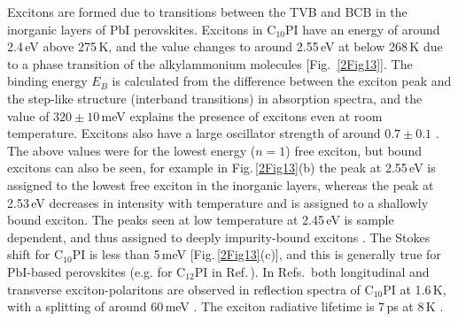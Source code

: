 Excitons are formed due to transitions between the TVB and BCB in the inorganic layers of PbI perovskites. Excitons in $\textrm{C}_{10}$PI have an energy of around 2.4\,eV above 275\,K, and the value changes to around 2.55\,eV at below 268\,K due to a phase transition of the alkylammonium molecules [Fig.\ \ref{2Fig13}]. The binding energy $E_B$ is calculated from the difference between the exciton peak and the step-like structure (interband transitions) in absorption spectra, and the value of $320\pm10$\,meV explains the presence of excitons even at room temperature. Excitons also have a large oscillator strength of around $0.7\pm0.1$ \cite{Ishihara1990}. The above values were for the lowest energy ($n=1$) free exciton, but bound excitons can also be seen, for example in Fig.\,\ref{2Fig13}(b) the peak at 2.55\,eV is assigned to the lowest free exciton in the inorganic layers, whereas the peak at 2.53\,eV decreases in intensity with temperature and is assigned to a shallowly bound exciton. The peaks seen at low temperature at 2.45\,eV is sample dependent, and thus assigned to deeply impurity-bound excitons \cite{Ishihara1990}. The Stokes shift for $\textrm{C}_{10}$PI is less than 5\,meV [Fig.\,\ref{2Fig13}(c)], and this is generally true for PbI-based perovskites (e.g. for $\textrm{C}_{12}$PI in Ref.\,\cite{Pradeesh2009}). In Refs.\,\cite{Ishihara1990, Ishihara1989} both longitudinal and transverse exciton-polaritons are observed in reflection spectra of $\textrm{C}_{10}$PI at 1.6\,K, with a splitting of around 60\,meV \cite{Ishihara1990}. The exciton radiative lifetime is 7\,ps at 8\,K \cite{Kondo1998a}.

